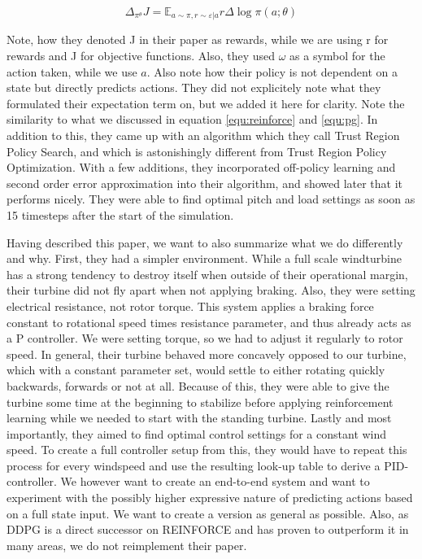 \documentclass[hyperref,beleg]{cgvpub}
\begin{document}
\begin{equation}
\Delta_{\pi^{\theta}} J = \mathbb{E}_{a \sim \pi, r \sim \varepsilon | a} r \Delta \log \pi(a;\theta)
\end{equation}

Note, how they denoted J in their paper as rewards, while we are using r for rewards and J for objective functions. Also, they used $\omega$ as a symbol for the action taken, while we use $a$. Also note how their policy is not dependent on a state but directly predicts actions. They did not explicitely note what they formulated their expectation term on, but we added it here for clarity. Note the similarity to what we discussed in equation \ref{equ:reinforce} and \ref{equ:pg}. In addition to this, they came up with an algorithm which they call Trust Region Policy Search, and which is astonishingly different from Trust Region Policy Optimization. With a few additions, they incorporated off-policy learning and second order error approximation into their algorithm, and showed later that it performs nicely. They were able to find optimal pitch and load settings as soon as 15 timesteps after the start of the simulation.

Having described this paper, we want to also summarize what we do differently and why. First, they had a simpler environment. While a full scale windturbine has a strong tendency to destroy itself when outside of their operational margin, their turbine did not fly apart when not applying braking. Also, they were setting electrical resistance, not rotor torque. This system applies a braking force constant to rotational speed times resistance parameter, and thus already acts as a P controller. We were setting torque, so we had to adjust it regularly to rotor speed. In general, their turbine behaved more concavely opposed to our turbine, which with a constant parameter set, would settle to either rotating quickly backwards, forwards or not at all. Because of this, they were able to give the turbine some time at the beginning to stabilize before applying reinforcement learning while we needed to start with the standing turbine. Lastly and most importantly, they aimed to find optimal control settings for a constant wind speed. To create a full controller setup from this, they would have to repeat this process for every windspeed and use the resulting look-up table to derive a PID-controller. We however want to create an end-to-end system and want to experiment with the possibly higher expressive nature of predicting actions based on a full state input. We want to create a version as general as possible. Also, as \ac{DDPG} is a direct successor on \ac{REINFORCE} and has proven to outperform it in many areas, we do not reimplement their paper.
\end{document}
